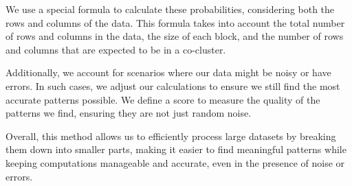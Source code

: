 We use a special formula to calculate these probabilities, considering both the rows and columns of the data. This formula takes into account the total number of rows and columns in the data, the size of each block, and the number of rows and columns that are expected to be in a co-cluster.

Additionally, we account for scenarios where our data might be noisy or have errors. In such cases, we adjust our calculations to ensure we still find the most accurate patterns possible. We define a score to measure the quality of the patterns we find, ensuring they are not just random noise.

Overall, this method allows us to efficiently process large datasets by breaking them down into smaller parts, making it easier to find meaningful patterns while keeping computations manageable and accurate, even in the presence of noise or errors.
